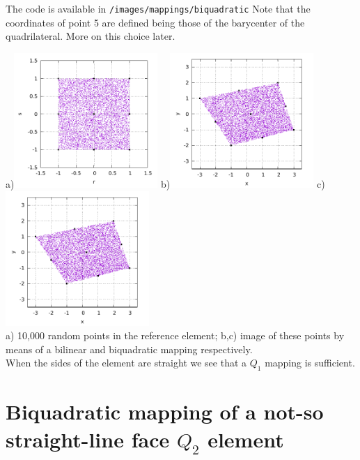 The code is available in {\tt /images/mappings/biquadratic}
Note that the coordinates of point 5 are defined being those of the barycenter
of the quadrilateral. More on this choice later.

\begin{center}
a)\includegraphics[width=5.45cm]{images/mappings/biquadratic/rs.pdf}
b)\includegraphics[width=5.45cm]{images/mappings/biquadratic/xyQ1.pdf}
c)\includegraphics[width=5.45cm]{images/mappings/biquadratic/xyQ2.pdf}\\
{\captionfont a) 10,000 random points in the reference element; 
b,c) image of these points by means of a bilinear and biquadratic mapping 
respectively.\\ When the sides of the element
are straight we see that a $Q_1$ mapping is sufficient.}
\end{center}

\section{Biquadratic mapping of a not-so straight-line face $Q_2$ element }

